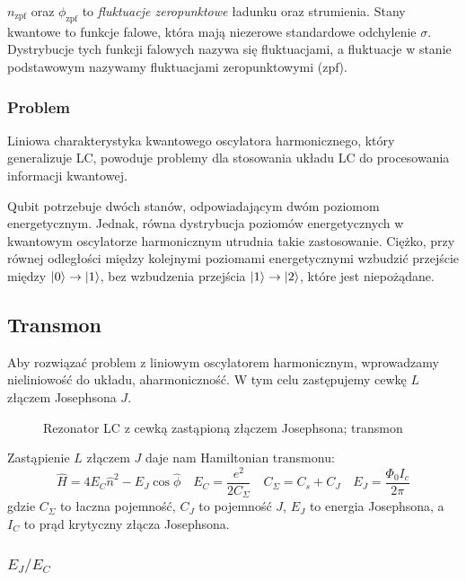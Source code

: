 \documentclass{../notatki}
\newcommand{\zpf}{\mathrm{zpf}}
\begin{document}
$n_\zpf$ oraz $\phi_\zpf$ to \textit{fluktuacje zeropunktowe} ładunku
oraz strumienia. Stany kwantowe to funkcje falowe, która mają
niezerowe standardowe odchylenie $\sigma$. Dystrybucje tych funkcji
falowych nazywa się fluktuacjami, a fluktuacje w stanie podstawowym
nazywamy fluktuacjami zeropunktowymi ($\zpf$).

\subsubsection{Problem}

Liniowa charakterystyka kwantowego oscylatora harmonicznego, który
generalizuje LC, powoduje problemy dla stosowania układu LC do
procesowania informacji kwantowej.

Qubit potrzebuje dwóch stanów, odpowiadającym dwóm poziomom
energetycznym. Jednak, równa dystrybucja
poziomów energetycznych w kwantowym oscylatorze harmonicznym utrudnia
takie zastosowanie. Ciężko, przy równej odległości między kolejnymi poziomami
energetycznymi wzbudzić przejście między $\ket{0} \to \ket{1}$, bez wzbudzenia
przejścia $\ket{1} \to \ket{2}$, które jest niepożądane.

\subsection{Transmon}

Aby rozwiązać problem z liniowym oscylatorem harmonicznym,
wprowadzamy nieliniowość do układu, aharmoniczność. W tym celu
zastępujemy cewkę $L$ złączem Josephsona $J$.
\begin{figure}[h]
  \centering
  \caption{Rezonator LC z cewką zastąpioną złączem Josephsona; transmon}
\end{figure}

Zastąpienie $L$ złączem $J$ daje nam Hamiltonian transmonu:
$$
\hat{H} = 4 E_C \hat{n}^2 - E_J \cos \hat{\phi} \quad E_C =
\frac{e^2}{2C_\Sigma} \quad C_\Sigma = C_s + C_J \quad E_J =
\frac{\Phi_0 I_c}{2\pi}
$$
gdzie $C_\Sigma$ to łaczna pojemność, $C_J$ to pojemność $J$, $E_J$
to energia Josephsona, a $I_C$ to prąd krytyczny złącza Josephsona.

\subsubsection{\texorpdfstring{$E_J / E_C$}{E\_J / E\_C}}
\end{document}
